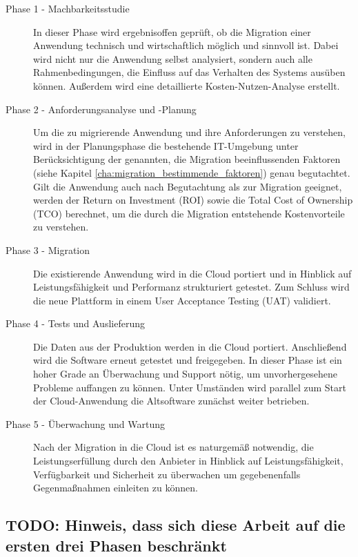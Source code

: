 \begin{description}
	\item[Phase 1 - Machbarkeitsstudie] In dieser Phase wird ergebnisoffen 
geprüft, ob die Migration einer Anwendung technisch und wirtschaftlich möglich 
und sinnvoll ist. Dabei wird nicht nur die Anwendung selbst analysiert, sondern 
auch alle Rahmenbedingungen, die Einfluss auf das Verhalten des Systems ausüben 
können. Außerdem wird eine detaillierte Kosten-Nutzen-Analyse erstellt.	

	\item[Phase 2 - Anforderungsanalyse und -Planung] Um die zu migrierende 
Anwendung und ihre Anforderungen zu verstehen, wird in der Planungsphase die 
bestehende IT-Umgebung unter Berücksichtigung der genannten, die Migration 
beeinflussenden Faktoren (siehe  Kapitel 
\ref{cha:migration_bestimmende_faktoren}) 
genau begutachtet. Gilt die Anwendung auch nach Begutachtung als zur Migration 
geeignet, werden der Return on Investment (ROI) sowie die Total Cost of 
Ownership (TCO) berechnet, um die durch die Migration entstehende 
Kostenvorteile 
zu verstehen.
	
	\item[Phase 3 - Migration] Die existierende Anwendung wird in die Cloud 
portiert und in Hinblick auf Leistungsfähigkeit und Performanz strukturiert 
getestet. Zum Schluss wird die neue Plattform in einem User Acceptance Testing 
(UAT) validiert. 
	
	\item[Phase 4 - Tests und Auslieferung] Die Daten aus der Produktion 
werden in die Cloud portiert. Anschließend wird die Software erneut getestet 
und freigegeben. In dieser Phase ist ein hoher Grade an Überwachung und Support 
nötig, um unvorhergesehene Probleme auffangen zu können. Unter Umständen wird 
parallel zum Start der Cloud-Anwendung die Altsoftware zunächst weiter 
betrieben.

	\item[Phase 5 - Überwachung und Wartung] Nach der Migration in die 
Cloud ist es naturgemäß notwendig, die Leistungserfüllung durch den Anbieter in 
Hinblick auf Leistungsfähigkeit, Verfügbarkeit und Sicherheit zu überwachen um 
gegebenenfalls Gegenmaßnahmen einleiten zu können.
\end{description}


\subsection{TODO: Hinweis, dass sich diese Arbeit auf die ersten drei Phasen 
beschränkt}

